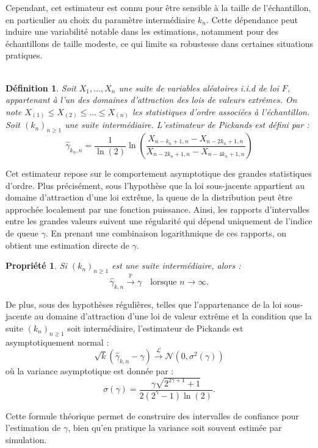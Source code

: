 \documentclass{article}
\theoremstyle{plain}
\newtheorem{definition}{Définition}[section]
\theoremstyle{definition}
\theoremstyle{plain}
\newtheorem{property}{Propriété}
\begin{document}
Cependant, cet estimateur est connu pour être sensible à la taille de l’échantillon, en particulier au choix du paramètre intermédiaire \(k_n\). Cette dépendance peut induire une variabilité notable dans les estimations, notamment pour des échantillons de taille modeste, ce qui limite sa robustesse dans certaines situations pratiques.
\\
\\
\medskip
\begin{definition}
Soit \(X_1, \dots, X_n\) une suite de variables aléatoires i.i.d de loi \(F\), appartenant à l’un des domaines d’attraction des lois de valeurs extrêmes. On note \(X_{(1)} \leq X_{(2)} \leq \dots \leq X_{(n)}\) les statistiques d’ordre associées à l’échantillon. Soit \((k_n)_{n \geq 1}\) une suite intermédiaire.
L’estimateur de Pickands est défini par :
\[
\hat{\gamma}_{k_n,n} = \frac{1}{\ln(2)} \ln\left( \frac{X_{n-k_n+1,n} - X_{n-2k_n+1,n}}{X_{n-2k_n+1,n} - X_{n-4k_n+1,n}} \right)
\]
\end{definition}
\medskip
Cet estimateur repose sur le comportement asymptotique des grandes statistiques d’ordre. Plus précisément, sous l’hypothèse que la loi sous-jacente appartient au domaine d’attraction d’une loi extrême, la queue de la distribution peut être approchée localement par une fonction puissance. Ainsi, les rapports d’intervalles entre les grandes valeurs suivent une régularité qui dépend uniquement de l’indice de queue \(\gamma\). En prenant une combinaison logarithmique de ces rapports, on obtient une estimation directe de \(\gamma\).
\medskip
\begin{property}
Si \((k_n)_{n \geq 1}\) est une suite intermédiaire, alors :
\[
\hat{\gamma}_{k,n} \xrightarrow{\mathbb{P}} \gamma
\quad \text{lorsque } n \to \infty.
\]
\end{property}
De plus, sous des hypothèses régulières, telles que l’appartenance de la loi sous-jacente au domaine d’attraction d’une loi de valeur extrême et la condition que la suite $(k_n)_{n \geq 1}$ soit intermédiaire, l’estimateur de Pickands est asymptotiquement normal :
\[
\sqrt{k} \left( \hat{\gamma}_{k,n} - \gamma \right) \xrightarrow{\mathcal{L}} \mathcal{N}(0, \sigma^2(\gamma))
\]
où la variance asymptotique est donnée par :
\[
\sigma(\gamma) = \frac{\gamma \sqrt{2^{2\gamma + 1} + 1}}{2(2^{\gamma} - 1)\ln(2)}.
\]

\medskip
Cette formule théorique permet de construire des intervalles de confiance pour l’estimation de \(\gamma\), bien qu’en pratique la variance soit souvent estimée par simulation.
\end{document}
